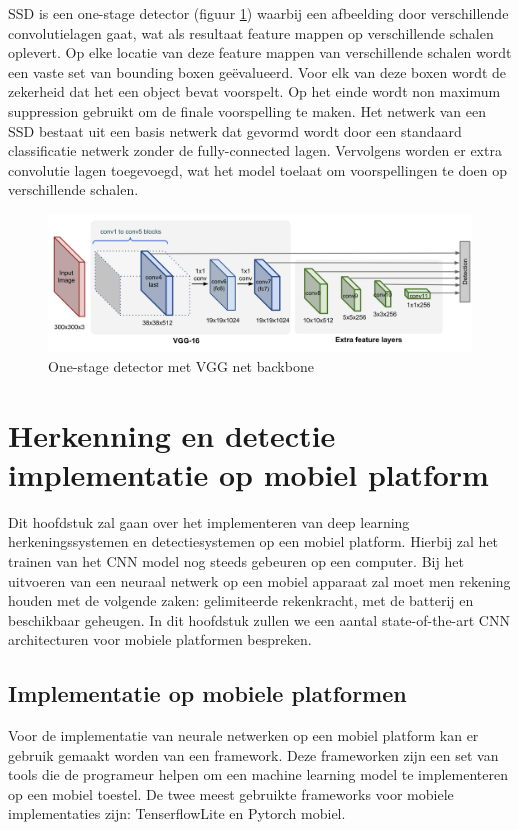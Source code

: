 SSD is een one-stage detector (figuur \ref{fig:ssd}) waarbij een afbeelding door verschillende convolutielagen gaat, wat als resultaat feature mappen op verschillende schalen oplevert.
Op elke locatie van deze feature mappen van verschillende schalen wordt een vaste set van bounding boxen ge\"evalueerd.
Voor elk van deze boxen wordt de zekerheid dat het een object bevat voorspelt.
Op het einde wordt non maximum suppression gebruikt om de finale voorspelling te maken.
Het netwerk van een SSD bestaat uit een basis netwerk dat gevormd wordt door een standaard classificatie netwerk zonder de fully-connected lagen.
Vervolgens worden er extra convolutie lagen toegevoegd, wat het model toelaat om voorspellingen te doen op verschillende schalen.

\begin{figure}[!ht]
	\centering
	\includegraphics[width=0.80\linewidth]{fig/SSD.png}
	\caption{One-stage detector met VGG net backbone}
	\label{fig:ssd}
\end{figure}

\chapter{Herkenning en detectie implementatie op mobiel platform}

Dit hoofdstuk zal gaan over het implementeren van deep learning herkeningssystemen en detectiesystemen op een mobiel platform.
Hierbij zal het trainen van het CNN model nog steeds gebeuren op een computer.
Bij het uitvoeren van een neuraal netwerk op een mobiel apparaat zal moet men rekening houden met de volgende zaken: 
gelimiteerde rekenkracht, met de batterij en beschikbaar geheugen.
In dit hoofdstuk zullen we een aantal state-of-the-art CNN architecturen voor mobiele platformen bespreken.

\section{Implementatie op mobiele platformen}
Voor de implementatie van neurale netwerken op een mobiel platform kan er gebruik gemaakt worden van een framework.
Deze frameworken zijn een set van tools die de programeur helpen om een machine learning model te implementeren op een mobiel toestel.
De twee meest gebruikte frameworks voor mobiele implementaties zijn: TenserflowLite en Pytorch mobiel.

